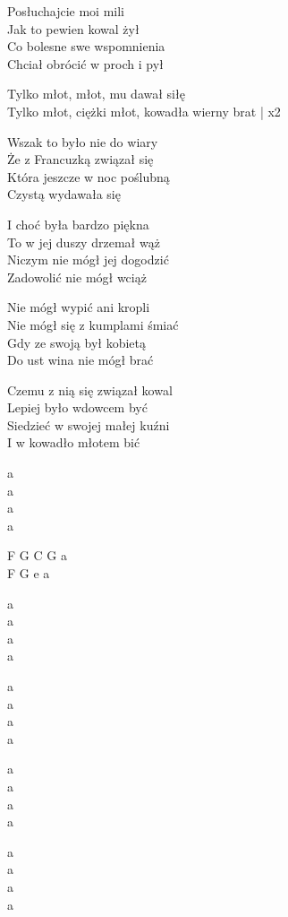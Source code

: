\begin{text}
    Posłuchajcie moi mili\\
    Jak to pewien kowal żył\\
    Co bolesne swe wspomnienia\\
    Chciał obrócić w proch i pył

    \vin Tylko młot, młot, mu dawał siłę\\
    \vin Tylko młot, ciężki młot, kowadła wierny brat | x2

    Wszak to było nie do wiary\\
    Że z Francuzką związał się\\
    Która jeszcze w noc poślubną\\
    Czystą wydawała się

    I choć była bardzo piękna\\
    To w jej duszy drzemał wąż\\
    Niczym nie mógł jej dogodzić\\
    Zadowolić nie mógł wciąż

    Nie mógł wypić ani kropli\\
    Nie mógł się z kumplami śmiać\\
    Gdy ze swoją był kobietą\\
    Do ust wina nie mógł brać

    Czemu z nią się związał kowal\\
    Lepiej było wdowcem być\\
    Siedzieć w swojej małej kuźni\\
    I w kowadło młotem bić

\end{text}
\begin{chord}
    a\\
    a\\
    a\\
    a

    F G C G a\\
    F G e a

    a\\
    a\\
    a\\
    a

    a\\
    a\\
    a\\
    a

    a\\
    a\\
    a\\
    a

    a\\
    a\\
    a\\
    a
\end{chord}